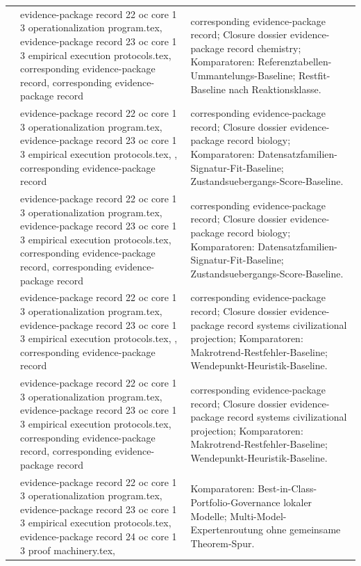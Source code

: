 \begin{longtable}{@{}L{0.16\textwidth}L{0.38\textwidth}L{0.34\textwidth}@{}}
 & evidence-package record 22 oc core 1 3 operationalization program.tex, \allowbreak evidence-package record 23 oc core 1 3 empirical execution protocols.tex, corresponding evidence-package record, corresponding evidence-package record & corresponding evidence-package record; Closure dossier evidence-package record chemistry; Komparatoren: Referenztabellen-Ummantelungs-Baseline; Restfit-Baseline nach Reaktionsklasse. \\
 & evidence-package record 22 oc core 1 3 operationalization program.tex, \allowbreak evidence-package record 23 oc core 1 3 empirical execution protocols.tex, \allowbreak {}, corresponding evidence-package record & corresponding evidence-package record; Closure dossier evidence-package record biology; Komparatoren: Datensatzfamilien-Signatur-Fit-Baseline; Zustandsuebergangs-Score-Baseline. \\
 & evidence-package record 22 oc core 1 3 operationalization program.tex, \allowbreak evidence-package record 23 oc core 1 3 empirical execution protocols.tex, corresponding evidence-package record, corresponding evidence-package record & corresponding evidence-package record; Closure dossier evidence-package record biology; Komparatoren: Datensatzfamilien-Signatur-Fit-Baseline; Zustandsuebergangs-Score-Baseline. \\
 & evidence-package record 22 oc core 1 3 operationalization program.tex, \allowbreak evidence-package record 23 oc core 1 3 empirical execution protocols.tex, \allowbreak {}, corresponding evidence-package record & corresponding evidence-package record; Closure dossier evidence-package record systems civilizational projection; Komparatoren: Makrotrend-Restfehler-Baseline; Wendepunkt-Heuristik-Baseline. \\
 & evidence-package record 22 oc core 1 3 operationalization program.tex, \allowbreak evidence-package record 23 oc core 1 3 empirical execution protocols.tex, corresponding evidence-package record, corresponding evidence-package record & corresponding evidence-package record; Closure dossier evidence-package record systems civilizational projection; Komparatoren: Makrotrend-Restfehler-Baseline; Wendepunkt-Heuristik-Baseline. \\
 & evidence-package record 22 oc core 1 3 operationalization program.tex, \allowbreak evidence-package record 23 oc core 1 3 empirical execution protocols.tex, \allowbreak evidence-package record 24 oc core 1 3 proof machinery.tex, \allowbreak {} & Komparatoren: Best-in-Class-Portfolio-Governance lokaler Modelle; Multi-Model-Expertenroutung ohne gemeinsame Theorem-Spur. \\
\bottomrule
\end{longtable}

